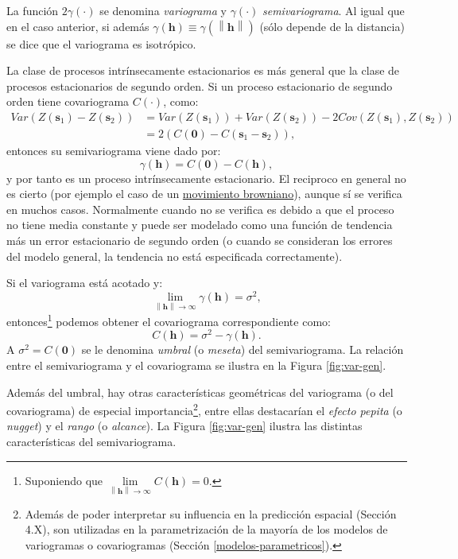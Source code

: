 \documentclass[
  spanish,
]{book}
\theoremstyle{break}
\theoremstyle{definition}
\theoremstyle{definition}
\theoremstyle{definition}
\theoremstyle{definition}
\theoremstyle{remark}
\begin{document}
La función \(2\gamma (\cdot)\) se denomina \emph{variograma} y \(\gamma (\cdot)\) \emph{semivariograma}.
Al igual que en el caso anterior, si además \(\gamma(\mathbf{h}) \equiv \gamma(\left\| \mathbf{h}\right\|)\) (sólo depende de la distancia) se dice que el variograma es isotrópico.

La clase de procesos intrínsecamente estacionarios es más general que la clase de procesos estacionarios de segundo orden.
Si un proceso estacionario de segundo orden tiene covariograma \(C(\cdot)\), como:
\[\begin{aligned}
Var(Z(\mathbf{s}_1)-Z(\mathbf{s}_2)) &= Var(Z(\mathbf{s}_1)) + Var(Z(\mathbf{s}_2))-2Cov(Z(\mathbf{s}_1),Z(\mathbf{s}_2)) \\
&=2\left(C(\mathbf{0})-C(\mathbf{s}_1 -\mathbf{s}_2)\right),
\end{aligned}\]
entonces su semivariograma viene dado por:
\[\gamma (\mathbf{h}) = C(\mathbf{0})-C(\mathbf{h}),\]
y por tanto es un proceso intrínsecamente estacionario.
El reciproco en general no es cierto (por ejemplo el caso de un \href{https://es.wikipedia.org/wiki/Movimiento_browniano\#Matem\%C3\%A1ticas}{movimiento browniano}), aunque sí se verifica en muchos casos.
Normalmente cuando no se verifica es debido a que el proceso no tiene media constante y puede ser modelado como una función de tendencia más un error estacionario de segundo orden (o cuando se consideran los errores del modelo general, la tendencia no está especificada correctamente).

Si el variograma está acotado y:
\[\lim \limits_{\left\| \mathbf{h}\right\| \rightarrow \infty }\gamma(\mathbf{h})=\sigma^2,\]
entonces\footnote{Suponiendo que \(\lim \limits_{\left\| \mathbf{h}\right\| \rightarrow \infty } C(\mathbf{h})=0\).} podemos obtener el covariograma correspondiente como:
\[C(\mathbf{h})=\sigma^2-\gamma (\mathbf{h}).\]
A \(\sigma^{2} = C(\mathbf{0})\) se le denomina \emph{umbral} (o \emph{meseta}) del semivariograma.
La relación entre el semivariograma y el covariograma se ilustra en la Figura \ref{fig:var-gen}.

Además del umbral, hay otras características geométricas del variograma (o del covariograma) de especial importancia\footnote{Además de poder interpretar su influencia en la predicción espacial (Sección 4.X), son utilizadas en la parametrización de la mayoría de los modelos de variogramas o covariogramas (Sección \ref{modelos-parametricos}).}, entre ellas destacarían el \emph{efecto pepita} (o \emph{nugget}) y el \emph{rango} (o \emph{alcance}).
La Figura \ref{fig:var-gen} ilustra las distintas características del semivariograma.
\end{document}
